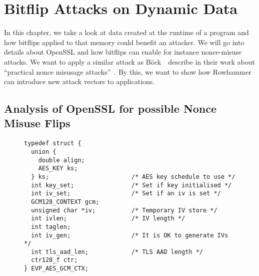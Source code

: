 \chapter{Bitflip Attacks on Dynamic Data}\label{sec:dynattack}

In this chapter, we take a look at data created at the runtime of a program
and how bitflips applied to that memory could benefit an attacker. We will go
into details about OpenSSL and how bitflips can enable for instance
nonce-misuse attacks. We want to apply a similar attack as Böck~\etal~describe
in their work about ``practical nonce misusage attacks''~\cite{gcmnonceattack}.
By this, we want to show how Rowhammer can introduce new attack vectors to
applications.

\section{Analysis of OpenSSL for possible Nonce Misuse Flips}

\begin{figure}
\begin{minipage}{\linewidth}
\begin{lstlisting}[style=CStyle,
                   caption={Struct used by OpenSSL to describe the AES-GCM
context. The IV used is stored in the memory pointed to by \texttt{iv}. Source
is taken from OpenSSL version $1.1.0g$},
                   label={lst:aesstruct}]
typedef struct {
  union {
    double align;
    AES_KEY ks;
  } ks;                       /* AES key schedule to use */
  int key_set;                /* Set if key initialised */
  int iv_set;                 /* Set if an iv is set */
  GCM128_CONTEXT gcm;
  unsigned char *iv;          /* Temporary IV store */
  int ivlen;                  /* IV length */
  int taglen;
  int iv_gen;                 /* It is OK to generate IVs */
  int tls_aad_len;            /* TLS AAD length */
  ctr128_f ctr;
} EVP_AES_GCM_CTX;
\end{lstlisting}
\end{minipage}
\end{figure}

